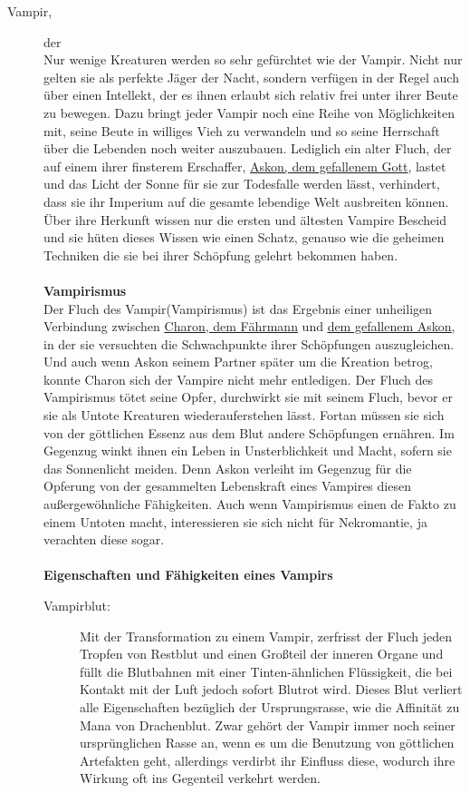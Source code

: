 \documentclass[a4paper,12pt,oneside]{book}
\begin{document}
\begin{description}
\item[Vampir,] der\label{Vampir}
\\Nur wenige Kreaturen werden so sehr gefürchtet wie der Vampir. Nicht nur gelten sie als perfekte Jäger der Nacht, sondern verfügen in der Regel auch über einen Intellekt, der es ihnen erlaubt sich relativ frei unter ihrer Beute zu bewegen. Dazu bringt jeder Vampir noch eine Reihe von Möglichkeiten mit, seine Beute in williges Vieh zu verwandeln und so seine Herrschaft über die Lebenden noch weiter auszubauen. Lediglich ein alter Fluch, der auf einem ihrer finsterem Erschaffer, \uline{\hyperref[Askon]{Askon, dem gefallenem Gott}}, lastet und das Licht der Sonne für sie zur Todesfalle werden lässt, verhindert, dass sie ihr Imperium auf die gesamte lebendige Welt ausbreiten können. Über ihre Herkunft wissen nur die ersten und ältesten Vampire Bescheid und sie hüten dieses Wissen wie einen Schatz, genauso wie die geheimen Techniken die sie bei ihrer Schöpfung gelehrt bekommen haben.
\\\\\textbf{Vampirismus}
\\Der Fluch des Vampir(Vampirismus) ist das Ergebnis einer unheiligen Verbindung zwischen \uline{\hyperref[Charon]{Charon, dem Fährmann}} und \uline{\hyperref[Askon]{dem gefallenem Askon}}, in der sie versuchten die Schwachpunkte ihrer Schöpfungen auszugleichen. Und auch wenn Askon seinem Partner später um die Kreation betrog, konnte Charon sich der Vampire nicht mehr entledigen. Der Fluch des Vampirismus tötet seine Opfer, durchwirkt sie mit seinem Fluch, bevor er sie als Untote Kreaturen wiederauferstehen lässt. Fortan müssen sie sich von der göttlichen Essenz aus dem Blut andere Schöpfungen ernähren. Im Gegenzug winkt ihnen ein Leben in Unsterblichkeit und Macht, sofern sie das Sonnenlicht meiden. Denn Askon verleiht im Gegenzug für die Opferung von der gesammelten Lebenskraft eines Vampires diesen außergewöhnliche Fähigkeiten. Auch wenn Vampirismus einen de Fakto zu einem Untoten macht, interessieren sie sich nicht für Nekromantie, ja verachten diese sogar. 
\\\\\textbf{Eigenschaften und Fähigkeiten eines Vampirs}\\
\begin{description}
\item[Vampirblut:]
Mit der Transformation zu einem Vampir, zerfrisst der Fluch jeden Tropfen von Restblut und einen Großteil der inneren Organe und füllt die Blutbahnen mit einer Tinten-ähnlichen Flüssigkeit, die bei Kontakt mit der Luft jedoch sofort Blutrot wird. Dieses Blut verliert alle Eigenschaften bezüglich der Ursprungsrasse, wie die Affinität zu Mana von Drachenblut. Zwar gehört der Vampir immer noch seiner ursprünglichen Rasse an, wenn es um die Benutzung von göttlichen Artefakten geht, allerdings verdirbt ihr Einfluss diese, wodurch ihre Wirkung oft ins Gegenteil verkehrt werden.

\end{description}
\end{description}
\end{document}
